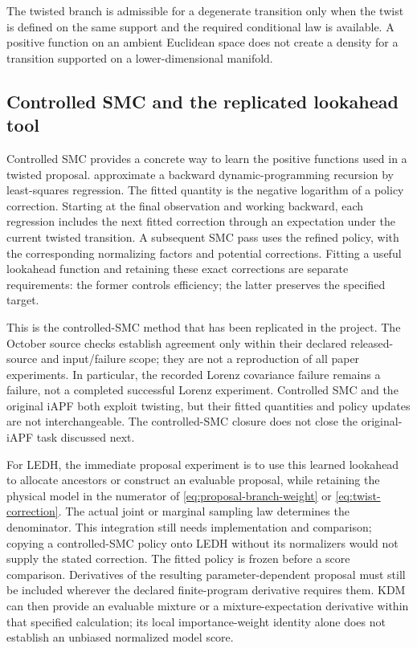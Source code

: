 \documentclass[11pt]{article}
\begin{document}
The twisted branch is admissible for a degenerate transition only when the
twist is defined on the same support and the required conditional law is
available. A positive function on an ambient Euclidean space does not create a
density for a transition supported on a lower-dimensional manifold.

\subsection{Controlled SMC and the replicated lookahead tool}
\label{sec:controlled-smc}

Controlled SMC provides a concrete way to learn the positive functions used
in a twisted proposal. \citet[Sections~4.2--4.3, equations~(20)--(21),
Algorithms~2--3]{heng2020controlled} approximate a backward dynamic-programming
recursion by least-squares regression. The fitted quantity is the negative
logarithm of a policy correction. Starting at the final observation and
working backward, each regression includes the next fitted correction
through an expectation under the current twisted transition. A subsequent
SMC pass uses the refined policy, with the corresponding normalizing factors
and potential corrections. Fitting a useful lookahead function and retaining
these exact corrections are separate requirements: the former controls
efficiency; the latter preserves the specified target.

This is the controlled-SMC method that has been replicated in the project.
The October source checks establish agreement only within their declared
released-source and input/failure scope; they are not a reproduction of all
paper experiments. In particular, the recorded Lorenz covariance failure
remains a failure, not a completed successful Lorenz experiment. Controlled
SMC and the original iAPF both exploit twisting, but their fitted quantities
and policy updates are not interchangeable. The controlled-SMC closure does
not close the original-iAPF task discussed next.

For LEDH, the immediate proposal experiment is to use this learned lookahead
to allocate ancestors or construct an evaluable proposal, while retaining
the physical model in the numerator of
\eqref{eq:proposal-branch-weight} or \eqref{eq:twist-correction}. The actual
joint or marginal sampling law determines the denominator. This integration
still needs implementation and comparison; copying a controlled-SMC policy
onto LEDH without its normalizers would not supply the stated correction.
The fitted policy is frozen before a score comparison. Derivatives of the
resulting parameter-dependent proposal must still be included wherever the
declared finite-program derivative requires them. KDM can then provide an
evaluable mixture or a mixture-expectation derivative within that specified
calculation; its local importance-weight identity alone does not establish
an unbiased normalized model score.
\end{document}
